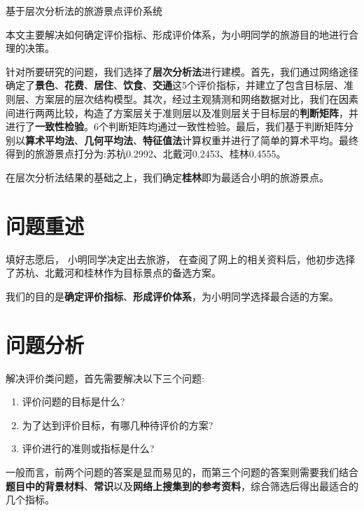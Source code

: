 \documentclass[withoutpreface]{cumcmthesis}
\begin{document}
    \begin{abstractpage}{基于层次分析法的旅游景点评价系统}
        
        本文主要解决如何确定评价指标、形成评价体系，为小明同学的旅游目的地进行合理的决策。

        针对所要研究的问题，我们选择了\textbf{层次分析法}进行建模。首先，我们通过网络途径确定了\textbf{景色}、\textbf{花费}、\textbf{居住}、\textbf{饮食}、\textbf{交通}这5个评价指标，并建立了包含目标层、准则层、方案层的层次结构模型。其次，经过主观猜测和网络数据对比，我们在因素间进行两两比较，构造了方案层关于准则层以及准则层关于目标层的\textbf{判断矩阵}，并进行了\textbf{一致性检验}。6个判断矩阵均通过一致性检验。最后，我们基于判断矩阵分别以\textbf{算术平均法}、\textbf{几何平均法}、\textbf{特征值法}计算权重并进行了简单的算术平均。最终得到的旅游景点打分为:苏杭0.2992、北戴河0.2453、桂林0.4555。

        在层次分析法结果的基础之上，我们确定\textbf{桂林}即为最适合小明的旅游景点。

    \end{abstractpage}

    \tocpage

    \section{问题重述}

    填好志愿后， 小明同学决定出去旅游， 在查阅了网上的相关资料后，他初步选择了苏杭、北戴河和桂林作为目标景点的备选方案。

    我们的目的是\textbf{确定评价指标}、\textbf{形成评价体系}，为小明同学选择最合适的方案。

    \section{问题分析}

    解决评价类问题，首先需要解决以下三个问题:
    \begin{enumerate}
        \item 评价问题的目标是什么?
        \item 为了达到评价目标，有哪几种待评价的方案?
        \item 评价进行的准则或指标是什么?
    \end{enumerate}

    一般而言，前两个问题的答案是显而易见的，而第三个问题的答案则需要我们结合\textbf{题目中的背景材料}、\textbf{常识}以及\textbf{网络上搜集到的参考资料}，综合筛选后得出最适合的几个指标。
\end{document}
